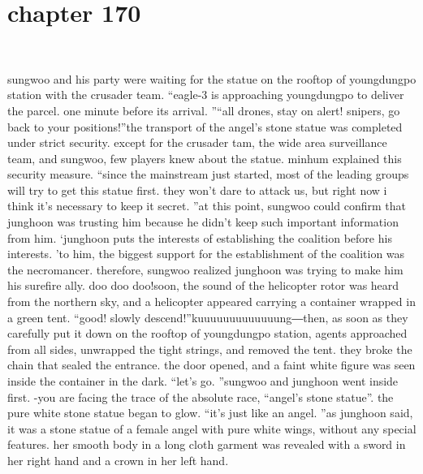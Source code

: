 \section{chapter 170}

                             




sungwoo and his party were waiting for the statue on the rooftop of youngdungpo station with the crusader team.
“eagle-3 is approaching youngdungpo to deliver the parcel.
 one minute before its arrival.
”“all drones, stay on alert! snipers, go back to your positions!”the transport of the angel’s stone statue was completed under strict security.
 except for the crusader tam, the wide area surveillance team, and sungwoo, few players knew about the statue.
minhum explained this security measure.
“since the mainstream just started, most of the leading groups will try to get this statue first.
 they won’t dare to attack us, but right now i think it’s necessary to keep it secret.
”at this point, sungwoo could confirm that junghoon was trusting him because he didn’t keep such important information from him.
‘junghoon puts the interests of establishing the coalition before his interests.
’to him, the biggest support for the establishment of the coalition was the necromancer.
 therefore, sungwoo realized junghoon was trying to make him his surefire ally.
doo doo doo!soon, the sound of the helicopter rotor was heard from the northern sky, and a helicopter appeared carrying a container wrapped in a green tent.
“good! slowly descend!”kuuuuuuuuuuuuung―then, as soon as they carefully put it down on the rooftop of youngdungpo station, agents approached from all sides, unwrapped the tight strings, and removed the tent.
 they broke the chain that sealed the entrance.
the door opened, and a faint white figure was seen inside the container in the dark.
“let’s go.
”sungwoo and junghoon went inside first.
-you are facing the trace of the absolute race, “angel’s stone statue”.
the pure white stone statue began to glow.
“it’s just like an angel.
”as junghoon said, it was a stone statue of a female angel with pure white wings, without any special features.
her smooth body in a long cloth garment was revealed with a sword in her right hand and a crown in her left hand.

